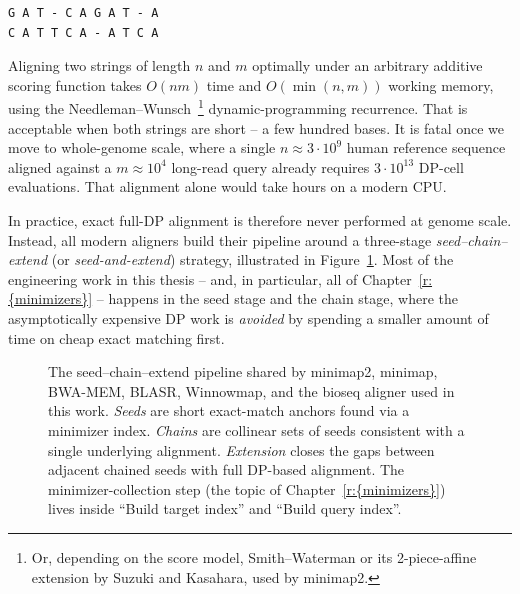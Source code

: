 \begin{verbatim}
G A T - C A G A T - A
C A T T C A - A T C A
\end{verbatim}

Aligning two strings of length $n$ and $m$ optimally under an
arbitrary additive scoring function takes $O(nm)$ time and $O(\min(n,
m))$ working memory, using the
Needleman--Wunsch~\cite{needleman_1970}\footnote{Or, depending on the
score model, Smith--Waterman or its 2-piece-affine extension by Suzuki
and Kasahara, used by minimap2.}  dynamic-programming recurrence.
That is acceptable when both strings are short -- a few hundred bases.
It is fatal once we move to whole-genome scale, where a single
$n \approx 3 \cdot 10^9$ human reference sequence aligned against a
$m \approx 10^4$ long-read query already requires
$3 \cdot 10^{13}$ DP-cell evaluations.  That alignment alone would
take hours on a modern CPU.

In practice, exact full-DP alignment is therefore never performed at
genome scale.  Instead, all modern aligners build their pipeline
around a three-stage \emph{seed--chain--extend}
(or \emph{seed-and-extend})
strategy, illustrated in Figure~\ref{fig:seed-chain-extend}.  Most of
the engineering work in this thesis -- and, in particular, all of
Chapter~\ref{r:{minimizers}} -- happens in the seed stage and
the chain stage, where the asymptotically expensive DP work is
\emph{avoided} by spending a smaller amount of time on cheap exact
matching first.

\begin{figure}[ht]
  \centering
  \caption{The seed--chain--extend pipeline shared by minimap2,
    minimap, BWA-MEM, BLASR, Winnowmap, and the bioseq aligner used in
    this work. \emph{Seeds} are short exact-match anchors found via a
    minimizer index. \emph{Chains} are collinear sets of seeds
    consistent with a single underlying alignment. \emph{Extension}
    closes the gaps between adjacent chained seeds with full
    DP-based alignment. The minimizer-collection step (the topic of
    Chapter~\ref{r:{minimizers}}) lives inside ``Build target
    index'' and ``Build query index''.}
  \label{fig:seed-chain-extend}
\end{figure}

